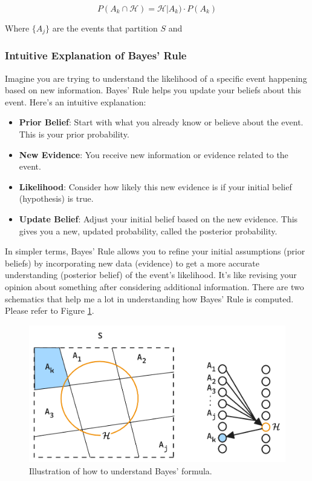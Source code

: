 \documentclass[a4paper,10pt]{article}
\newcommand{\hlt}[1]{\colorbox{color3}{#1}}
\newcommand{\hlti}[1]{\colorbox{color1}{#1}}
\begin{document}
\begin{equation}
P(A_k \cap \mathcal{H}) = \mathcal{H} | A_k) \cdot P(A_k)
\end{equation}

\noindent Where \(\{A_j\}\) are the events that partition \( S \) and

\subsubsection{Intuitive Explanation of Bayes' Rule}

Imagine you are trying to understand the likelihood of a specific event happening based on new information. Bayes' Rule helps you update your beliefs about this event. Here's an intuitive explanation:

\begin{itemize}
    \item \textbf{Prior Belief}: Start with what you already know or believe about the event. This is your \hlt{prior} probability.
    \item \textbf{New Evidence}: You receive \hlt{new information} or evidence related to the event.
    \item \textbf{Likelihood}: Consider how likely this new evidence is if your initial belief (hypothesis) is true.
    \item \textbf{Update Belief}: Adjust your initial belief based on the new evidence. This gives you a new, updated probability, called the \hlt{posterior} probability.
\end{itemize}

In simpler terms, Bayes' Rule allows you to refine your initial assumptions (prior beliefs) by incorporating new data (evidence) to get a more accurate understanding (posterior belief) of the event's likelihood. It's like revising your opinion about something after considering \hlti{additional information}. There are two schematics that help me a lot in understanding how Bayes' Rule is computed. Please refer to Figure \ref{fig:bayes_schematic}. 

\begin{figure}[ht]
\centering
\includegraphics[width=0.4\linewidth]{Figures/bayes_schematic.png}
\caption{Illustration of how to understand Bayes' formula.}
\label{fig:bayes_schematic}
\end{figure}
\end{document}
